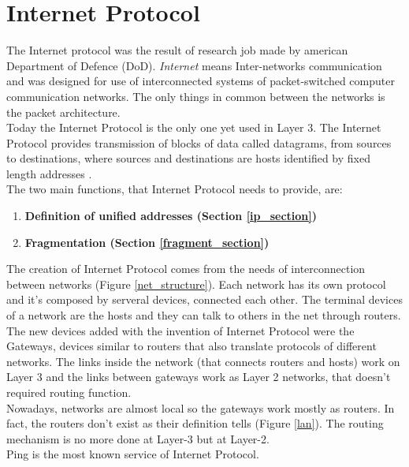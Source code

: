 \chapter{Internet Protocol}\label{layer3}
The Internet protocol was the result of research job made by american Department of Defence (DoD). \textit{Internet} means Inter-networks communication and was designed for use of interconnected systems of packet-switched computer communication networks. The only things in common between the networks is the packet architecture.\\
Today the Internet Protocol is the only one yet used in Layer 3. The Internet Protocol provides transmission of blocks of data called datagrams, from sources to destinations, where sources and destinations are hosts identified by fixed length addresses \cite{RFC791}.\\
The two main functions, that Internet Protocol needs to provide, are:
\begin{enumerate}
\item{\textbf{Definition of unified addresses (Section \ref{ip_section})}}
\item{\textbf{Fragmentation (Section \ref{fragment_section})}}
\end{enumerate}
The creation of Internet Protocol comes from the needs of interconnection between networks (Figure \ref{net_structure}). Each network has its own protocol and it's composed by serveral devices, connected each other. The terminal devices of a network are the hosts and they can talk to others in the net through routers.\\
The new devices added with the invention of Internet Protocol were the Gateways, devices similar to routers that also translate protocols of different networks. The links inside the network (that connects routers and hosts) work on Layer 3 and the links between gateways work as Layer 2 networks, that doesn't required routing function.\\
Nowadays, networks are almost local so the gateways work mostly as routers. In fact, the routers don't exist as their definition tells (Figure \ref{lan}). The routing mechanism is no more done at Layer-3 but at Layer-2.\\
Ping is the most known service of Internet Protocol.
